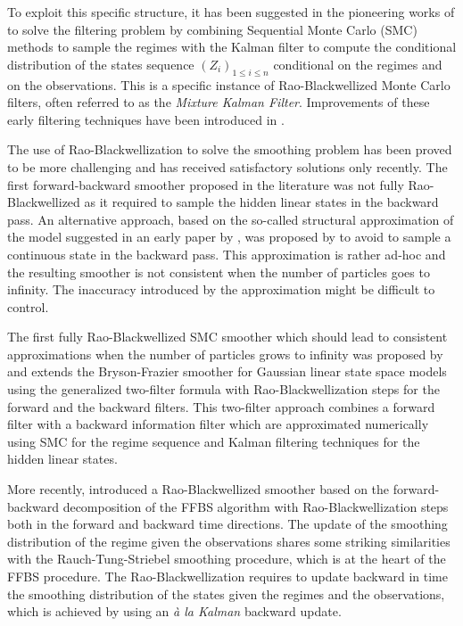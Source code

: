 \documentclass[nolayout]{article}
\theoremstyle{plain}
\theoremstyle{definition}
\newcommand{\1}{\mathbbm{1}}
\begin{document}
To exploit this specific structure, it has been suggested in the pioneering works of \cite{chen:liu:2000,doucet:godsill:andrieu:2000} to solve the filtering problem by combining Sequential Monte Carlo (SMC) methods to sample the regimes with the Kalman filter to compute the conditional distribution of the states sequence $(Z_i)_{1\le i\le n}$ conditional on the regimes and on the observations.
This is a specific instance of Rao-Blackwellized Monte Carlo filters, often referred to as the \emph{Mixture Kalman Filter}. Improvements of these early filtering techniques  have been introduced in \cite{doucet:gordon:krishnamurthy:2001,schon:gustafsson:nordlund:2005}. 

The use of Rao-Blackwellization to solve the smoothing problem has been proved to be more challenging and has received satisfactory solutions only recently. The first forward-backward smoother proposed in the literature \cite{fong:godsill:doucet:west:2002} was not fully Rao-Blackwellized as it required to sample the hidden linear states in the backward pass. An alternative approach, based on the so-called structural approximation of the model suggested in an early paper by \cite{kim:1994}, was proposed by \cite{barber:2006} to avoid to sample a continuous state in the backward pass. This approximation is rather ad-hoc and the resulting smoother is not consistent when the number of particles goes to infinity. The inaccuracy introduced by the approximation might be difficult to control.

The first fully Rao-Blackwellized SMC smoother which should lead to consistent approximations when the number of particles grows to infinity was proposed by  \cite{briers:doucet:maskell:2010} and extends the Bryson-Frazier smoother for Gaussian linear state space models using the generalized two-filter formula with Rao-Blackwellization steps for the forward and the backward filters.  This two-filter approach combines a forward filter with a backward information filter which are approximated numerically using SMC for the regime sequence and Kalman filtering techniques for the hidden linear states.

More recently, \cite{sarkka:bunch:godsill:2012,lindsten:bunch:godsill:schon:2013,lindsten:bunch:sarkka:schon:godsill:2015} introduced a Rao-Blackwellized smoother based on the forward-backward decomposition of the FFBS algorithm with Rao-Blackwellization steps both in the forward and backward time directions. The update of the smoothing distribution of the regime given the observations shares some striking similarities with the Rauch-Tung-Striebel smoothing procedure, which is at the heart of the FFBS procedure. The Rao-Blackwellization requires to update backward in time the smoothing distribution of the states given the regimes and the observations, which is achieved by using an \emph{\`a la Kalman} backward update.
\end{document}
